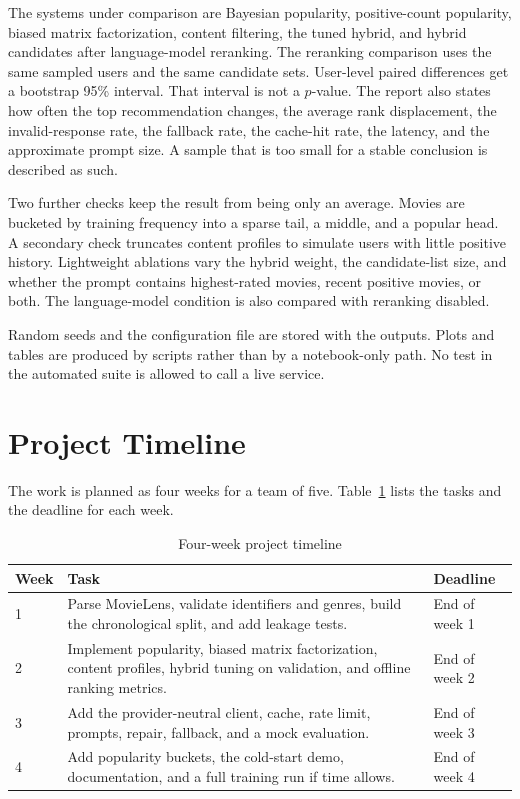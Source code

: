 \documentclass[conference]{IEEEtran}
\begin{document}
The systems under comparison are Bayesian popularity, positive-count popularity, biased matrix factorization, content filtering, the tuned hybrid, and hybrid candidates after language-model reranking. The reranking comparison uses the same sampled users and the same candidate sets. User-level paired differences get a bootstrap 95\% interval. That interval is not a \(p\)-value. The report also states how often the top recommendation changes, the average rank displacement, the invalid-response rate, the fallback rate, the cache-hit rate, the latency, and the approximate prompt size. A sample that is too small for a stable conclusion is described as such.

Two further checks keep the result from being only an average. Movies are bucketed by training frequency into a sparse tail, a middle, and a popular head. A secondary check truncates content profiles to simulate users with little positive history. Lightweight ablations vary the hybrid weight, the candidate-list size, and whether the prompt contains highest-rated movies, recent positive movies, or both. The language-model condition is also compared with reranking disabled.

Random seeds and the configuration file are stored with the outputs. Plots and tables are produced by scripts rather than by a notebook-only path. No test in the automated suite is allowed to call a live service.

\section{Project Timeline}
The work is planned as four weeks for a team of five. Table~\ref{tab:timeline} lists the tasks and the deadline for each week.

\begin{table}[t]
\caption{Four-week project timeline}
\label{tab:timeline}
\centering
\footnotesize
\begin{tabular}{@{}p{}p{}p{}@{}}
\toprule
Week & Task & Deadline \\
\midrule
1 & Parse MovieLens, validate identifiers and genres, build the chronological split, and add leakage tests. & End of week 1 \\
2 & Implement popularity, biased matrix factorization, content profiles, hybrid tuning on validation, and offline ranking metrics. & End of week 2 \\
3 & Add the provider-neutral client, cache, rate limit, prompts, repair, fallback, and a mock evaluation. & End of week 3 \\
4 & Add popularity buckets, the cold-start demo, documentation, and a full training run if time allows. & End of week 4 \\
\bottomrule
\end{tabular}
\end{table}
\end{document}

